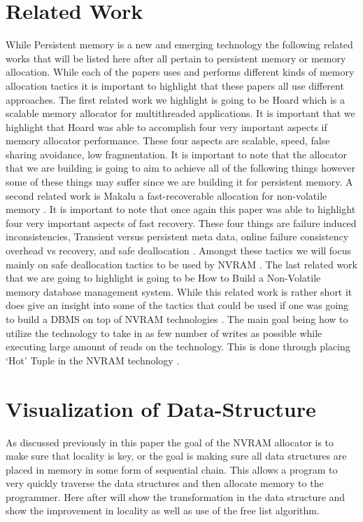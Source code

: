 \documentclass[conference]{IEEEtran}
\begin{document}
\section{Related Work}
While Persistent memory is a new and emerging technology the following related works that will be listed here after all pertain to persistent memory or memory allocation\cite{Arulrajdbms}. While each of the papers uses and performs different kinds of memory allocation tactics it is important to highlight that these papers all use different approaches. The first related work we highlight is going to be Hoard which is a scalable memory allocator for multithreaded applications. It is important that we highlight that Hoard was able to accomplish four very important aspects if memory allocator performance. These four aspects are scalable, speed, false sharing avoidance, low fragmentation. It is important to note that the allocator that we are building is going to aim to achieve all of the following things however some of these things may suffer since we are building it for persistent memory. A second related work is Makalu a fast-recoverable allocation for non-volatile memory \cite{Makalu}. It is important to note that once again this paper was able to highlight four very important aspects of fast recovery. These four things are failure induced inconsistencies, Transient versus persistent meta data, online failure consistency overhead vs recovery, and safe deallocation \cite{Makalu}. Amongst these tactics we will focus mainly on safe deallocation tactics to be used by NVRAM \cite{Makalu}. The last related work that we are going to highlight is going to be How to Build a Non-Volatile memory database management system. While this related work is rather short it does give an insight into some of the tactics that could be used if one was going to build a DBMS on top of NVRAM technologies \cite{Arulrajdbms}. The main goal being how to utilize the technology to take in as few number of writes as possible while executing large amount of reads on the technology. This is done through placing ‘Hot’ Tuple in the NVRAM technology \cite{Arulrajdbms}. 
\section{Visualization of Data-Structure} 
As discussed previously in this paper the goal of the NVRAM allocator is to make sure that locality is key, or the goal is making sure all data structures are placed in memory in some form of sequential chain. This allows a program to very quickly traverse the data structures and then allocate memory to the programmer. Here after will show the transformation in the data structure and show the improvement in locality as well as use of the free list algorithm. 
\end{document}
